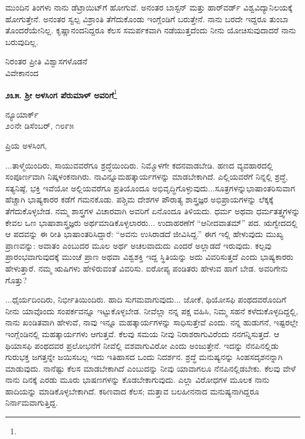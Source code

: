 ಮುಂದಿನ ತಿಂಗಳು ನಾನು ಡೆಟ್ರಾಯಿಟ್‌ಗೆ ಹೋಗುವೆ. ಅನಂತರ ಬಾಸ್ಟನ್ ಮತ್ತು ಹಾರ್‌ವರ್ಡ್‌ ವಿಶ್ವವಿದ್ಯಾನಿಲಯಕ್ಕೆ ಹೋಗುತ್ತೇನೆ. ಅನಂತರ ಸ್ವಲ್ಪ ವಿಶ್ರಾಂತಿ ತೆಗೆದುಕೊಂಡು ಇಂಗ್ಲೆಂಡಿಗೆ ಬರುತ್ತೇನೆ. ನಾನು ಬರದೇ ಇದ್ದರೂ ತುಂಬಾ ತೊಂದರೆಯೇನಿಲ್ಲ. ಕೃಷ್ಣಾನಂದನಿದ್ದರೂ ಕೆಲಸ ಸಮರ್ಪಕವಾಗಿ ನಡೆಯುತ್ತದೆಂದು ನೀನು ಯೋಚಿಸುವು\break ದಾದರೆ ನಾನು ಬರುವುದಿಲ್ಲ.

\vspace{-0.5cm}

{\flushright
ನಿರಂತರ ಪ್ರೀತಿ ವಿಶ್ವಾಸಗಳೊಡನೆ\\ವಿವೇಕಾನಂದ\par}

\begin{center}
\textbf{೨೩೫. ಶ‍್ರೀ ಅಳಸಿಂಗ ಪೆರುಮಾಳ್ ಅವರಿಗೆ}\footnote{}
\end{center}

\vspace{-0.7cm}

\begin{flushright}
ನ್ಯೂಯಾರ್ಕ್\\೨೦ನೇ ಡಿಸೆಂಬರ್, ೧೮೯೫
\end{flushright}

\vspace{-0.3cm}

\noindent
ಪ್ರಿಯ ಅಳಸಿಂಗ,

...ತಾಳ್ಮೆಯಿಂದಿರು, ಸಾಯುವವರೆಗೂ ಶ್ರದ್ಧೆಯಿಂದಿರು. ನಿಮ್ಮೊಳಗೇ ಕದನವಾಡಬೇಡಿ. ಹಣದ ವ್ಯವಹಾರದಲ್ಲಿ ಸಂಪೂರ್ಣವಾಗಿ ನಿಷ್ಕಳಂಕನಾಗಿರು. ನಾವಿನ್ನೂ\break ಮಹತ್ಕಾರ್ಯಗಳನ್ನು ಮಾಡಬೇಕಾಗಿದೆ. ಎಲ್ಲಿಯವರೆಗೆ ನಿನ್ನಲ್ಲಿ ಶ್ರದ್ಧೆ, ಸತ್ಯನಿಷ್ಠೆ, ಭಕ್ತಿ ಇವೆಯೋ ಅಲ್ಲಿಯವರೆಗೂ ಪ್ರತಿಯೊಂದೂ ಅಭಿವೃದ್ಧಿಗೊಳ್ಳುವುದು...ಸೂತ್ರಗಳನ್ನು\break ಭಾಷಾಂತರಿಸುವಾಗ ಹೆಚ್ಚಾಗಿ ಭಾಷ್ಯಕಾರರ ಕಡೆಗೆ ಗಮನಕೊಡು. ಪಶ್ಚಿಮ ದೇಶಗಳ ಪೌರಾತ್ಯ ಶಾಸ್ತ್ರಜ್ಞರ ಅಭಿಪ್ರಾಯಗಳನ್ನು ಲೆಕ್ಕಕ್ಕೆ ತೆಗೆದುಕೊಳ್ಳಬೇಡ. ನಮ್ಮ ಶಾಸ್ತ್ರಗಳ ವಿಚಾರವಾಗಿ ಅವರಿಗೆ ಏನೊಂದೂ ತಿಳಿಯದು. ಧರ್ಮ ಅಥವಾ ಧರ್ಮತತ್ತ್ವಗಳನ್ನು ಕೇವಲ ಒಣ ಭಾಷಾಶಾಸ್ತ್ರಜ್ಞರು ಅರ್ಥಮಾಡಿಕೊಳ್ಳಲಾರರು... ಉದಾಹರಣೆಗೆ “ಆನೀದವಾತಮ್” ಪದ. ಋಗ್ವೇದದಲ್ಲಿ ಆ ಪದವನ್ನು ಈ ರೀತಿ ಭಾಷಾಂತರಿಸಿದ್ದಾರೆ: “ಅವನು ಉಸಿರಾಡದೆ ಜೀವಿಸಿದ್ದ.” ಈಗ ಇಲ್ಲಿ ಹೇಳುವುದು ಮುಖ್ಯ ಪ್ರಾಣವನ್ನು: ಅವಾತಂ ಎಂಬುದರ ಮೂಲ ಅರ್ಥ ಅಚಲವಾದುದು ಎಂದರೆ ಅಲ್ಲಾಡದೆ ಇರುವುದು. ಕಲ್ಪವು ಪ್ರಾರಂಭವಾಗುವುದಕ್ಕೆ ಮುಂಚೆ ಪ್ರಾಣ ಅಥವಾ ವಿಶ್ವಶಕ್ತಿ ಇದ್ದ ಸ್ಥಿತಿಯನ್ನು ಅದು ವಿವರಿಸುತ್ತದೆ ಎಂದು ಭಾಷ್ಯಕಾರರು ಹೇಳುತ್ತಾರೆ. ನಮ್ಮ ಋಷಿಗಳು ಹೇಳಿರುವಂತೆ ವಿವರಿಸು. ಐರೋಪ್ಯ ಪಂಡಿತರು ಹೇಳುವ ಹಾಗೆ ಬೇಡ. ಅವರಿಗೇನು ಗೊತ್ತು?

...ಧೈರ್ಯದಿಂದಿರು, ನಿರ್ಭೀತಿಯಿಂದಿರು. ಹಾದಿ ಸುಗಮವಾಗುವುದು... ಜೋಕೆ, ಥಿಯೋಸಫಿ ಪಂಥದವರೊಂದಿಗೆ ನೀನು ಯಾವೊಂದು ಸಂಪರ್ಕವನ್ನೂ ಇಟ್ಟುಕೊಳ್ಳಬೇಡ. ನೀವೆಲ್ಲಾ ನನ್ನ ಪಕ್ಷ ವಹಿಸಿ, ನಿಮ್ಮ ಸಹನೆ ಕಳೆದುಕೊಳ್ಳದಿದ್ದಲ್ಲಿ, ನಾನು ಖಂಡಿತವಾಗಿ ಹೇಳುವೆ, ನಾವು ಇನ್ನೂ ಮಹತ್ಕಾರ್ಯಗಳನ್ನು ಸಾಧಿಸುತ್ತೇವೆ ಎಂದು. ನನ್ನ ಹುಡುಗನೆ, ಇಷ್ಟರಲ್ಲೇ ಇಂಗ್ಲೆಂಡಿನಲ್ಲಿ ಮಹತ್ಕಾರ್ಯಗಳು ಆಗುತ್ತವೆ. ಕೆಲವು ಸಮಯ ನೀವು ನಿರಾಶರಾಗುವಿರೆಂದು ನನಗನ್ನಿಸುತ್ತದೆ. ಆ ಥಿಯಾಸಫಿ ಪಂಥದವರ ಪ್ರಲೋಭನೆಗೆ ನೀವೆಲ್ಲಿ ವಶವಾಗುವಿರೋ ಎಂದು ಅಂಜುತ್ತೇನೆ. ಇದನ್ನು ನೆನಪಿನಲ್ಲಿಡು ಗುರುಭಕ್ತ ಜಗತ್ತನ್ನೇ ಜಯಿಸಬಲ್ಲ\enginline{-} ಇದು ಇತಿಹಾಸದ ಒಂದು ನಿದರ್ಶನ. ಶ್ರದ್ಧೆ ಮನುಷ್ಯನನ್ನು ಸಿಂಹಸದೃಶನನ್ನಾಗಿ ಮಾಡುವುದು. ನಾನೆಷ್ಟು ಕೆಲಸ ಮಾಡಬೇಕಾಗಿದೆ ಎಂಬುದನ್ನು ನೀವು ಯಾವಾಗಲೂ ನೆನಪಿನಲ್ಲಿಡಬೇಕು. ಕೆಲವು ವೇಳೆ ನಾನು ದಿನಕ್ಕೆ ಎರಡು ಮೂರು ಭಾಷಣಗಳನ್ನು ಕೊಡಬೇಕಾಗುವುದು. ಎಲ್ಲಾ ವಿರೋಧಗಳ ಮೂಲಕ ನಾನು ಹಾದಿಯನ್ನು ಮಾಡಿಕೊಳ್ಳಬೇಕಾಗಿದೆ. ಕಠಿಣವಾದ ಕೆಲಸ; ಮತ್ತಾವ ಬಲಹೀನನಾದ ಮನುಷ್ಯನಾಗಿದ್ದರೂ ನಿರ್ನಾಮವಾಗುತ್ತಿದ್ದ.

